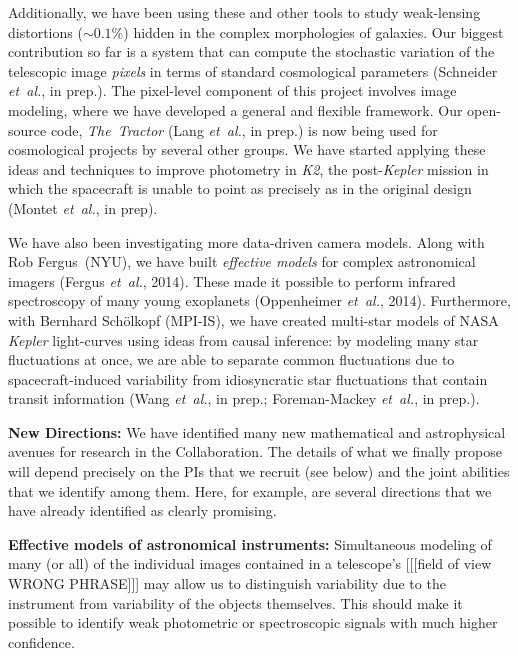 \documentclass[11pt]{article}
\newcommand{\foreign}[1]{\textsl{#1}}
\newcommand{\etal}{\foreign{et~al.}}
\newcommand{\project}[1]{\textsl{#1}}
\renewcommand{\paragraph}[1]{\smallskip\par\noindent\textbf{{#1}:}}
\begin{document}
Additionally, we have been using these and other tools to study
weak-lensing distortions ($\sim 0.1\%$) hidden in 
the complex morphologies of galaxies.
Our biggest contribution so far is a system
that can compute the stochastic variation of the telescopic 
image \emph{pixels}
in terms of standard cosmological parameters
(Schneider \etal, in prep.).
The pixel-level component of this project involves image modeling,
where we have developed a general and flexible framework.
Our open-source code, \project{The~Tractor} (Lang \etal,
in prep.) is now being used for cosmological projects by several other groups.
We have started applying these ideas and techniques to 
improve photometry in \project{K2}, the
post-\project{Kepler} mission in which the spacecraft is unable to point
as precisely as in the original design (Montet \etal, in prep).

We have also been investigating more data-driven camera models.
Along with Rob Fergus~(NYU), we have built
{\em effective models} for complex astronomical 
imagers (Fergus \etal, 2014).
These made it possible to perform infrared spectroscopy of many 
young exoplanets (Oppenheimer \etal, 2014).
Furthermore, with Bernhard Sch\"olkopf (MPI-IS), we have created
multi-star models of NASA \project{Kepler} light-curves using ideas from
causal inference:
by modeling many star fluctuations at once, we are able to separate
common fluctuations due to spacecraft-induced variability from idiosyncratic
star fluctuations that contain transit information (Wang \etal, in prep.;
Foreman-Mackey \etal, in prep.).

\paragraph{New Directions}
We have identified many new mathematical and astrophysical avenues for
research in the Collaboration.
The details of what we finally propose will depend precisely on the
PIs that we recruit (see below) and the joint abilities that we
identify among them.
Here, for example, are several directions that we have already
identified as clearly promising.

\textbf{Effective models of astronomical instruments:}
Simultaneous modeling of many (or all) of the individual images contained in
a telescope's [[[field of view WRONG PHRASE]]] 
may allow us to distinguish variability due to the instrument from
variability of the objects themselves.  
This should make it possible to identify weak photometric or spectroscopic
signals with much higher confidence.
\end{document}
